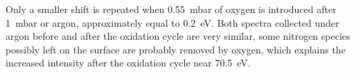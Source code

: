 Only a smaller shift is repeated when \qty{0.55}{\milli\bar} of oxygen is introduced after \qty{1}{\milli\bar} or argon, approximately equal to \qty{0.2}{\eV}.
Both spectra collected under argon before and after the oxidation cycle are very similar, some nitrogen species possibly left on the surface are probably removed by oxygen, which explains the increased intensity after the oxidation cycle near \qty{70.5}{\eV}.

